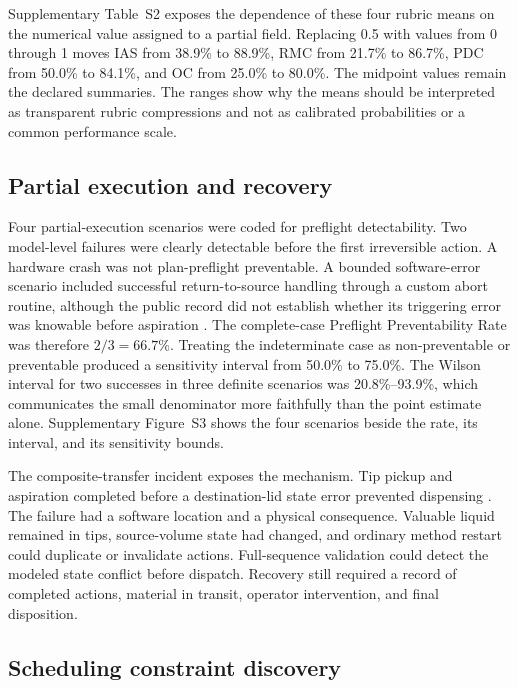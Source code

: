 Supplementary Table~S2 exposes the dependence of these four rubric means on the numerical value assigned to a partial field. Replacing 0.5 with values from 0 through 1 moves IAS from 38.9\% to 88.9\%, RMC from 21.7\% to 86.7\%, PDC from 50.0\% to 84.1\%, and OC from 25.0\% to 80.0\%. The midpoint values remain the declared summaries. The ranges show why the means should be interpreted as transparent rubric compressions and not as calibrated probabilities or a common performance scale.

\subsection{Partial execution and recovery}

Four partial-execution scenarios were coded for preflight detectability. Two model-level failures were clearly detectable before the first irreversible action. A hardware crash was not plan-preflight preventable. A bounded software-error scenario included successful return-to-source handling through a custom abort routine, although the public record did not establish whether its triggering error was knowable before aspiration \cite{forum_return_volume}. The complete-case Preflight Preventability Rate was therefore $2/3=66.7\%$. Treating the indeterminate case as non-preventable or preventable produced a sensitivity interval from 50.0\% to 75.0\%. The Wilson interval for two successes in three definite scenarios was 20.8\%--93.9\%, which communicates the small denominator more faithfully than the point estimate alone. Supplementary Figure~S3 shows the four scenarios beside the rate, its interval, and its sensitivity bounds.

The composite-transfer incident exposes the mechanism. Tip pickup and aspiration completed before a destination-lid state error prevented dispensing \cite{forum_error_catching}. The failure had a software location and a physical consequence. Valuable liquid remained in tips, source-volume state had changed, and ordinary method restart could duplicate or invalidate actions. Full-sequence validation could detect the modeled state conflict before dispatch. Recovery still required a record of completed actions, material in transit, operator intervention, and final disposition.

\subsection{Scheduling constraint discovery}

